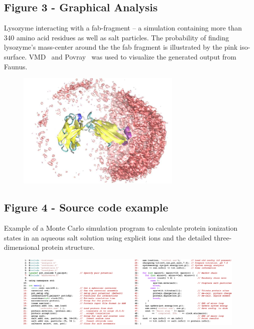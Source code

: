 \documentclass[10pt]{bmc_article}
\newenvironment{bmcformat}{\begin{raggedright}\baselineskip20pt\sloppy\setboolean{publ}{false}}{\end{raggedright}\baselineskip20pt\sloppy}
\begin{document}
\begin{bmcformat}
  \subsection*{Figure 3 - Graphical Analysis}
     Lysozyme interacting with a fab-fragment -- a simulation containing
     more than 340 amino acid residues as well as salt particles.
     The probability of finding lysozyme's mass-center around
     the the fab fragment is illustrated by the pink iso-surface.
     VMD~\cite{vmd} and Povray~\cite{povray} was used to visualize the generated output from Faunus.
     \begin{figure}[ht]\center
           \label{fig:snapshot}
      \includegraphics[width=8cm]{pics/snapshot}
      \end{figure}

  \subsection*{Figure 4 - Source code example}
      Example of a Monte Carlo simulation program to calculate protein
      ionization states in an aqueous salt solution using explicit ions and the detailed three-dimensional protein structure. 
      \begin{figure}[ht]\center
      \includegraphics[width=16.5cm]{pics/source}
      \end{figure}
      

\end{bmcformat}
\end{document}
